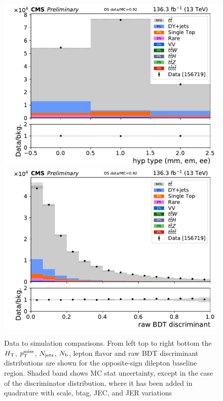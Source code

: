 \begin{figure}[!htb]
\includegraphics[width=0.45\linewidth]{figs/ftan/cr/run2_os_type_in.pdf} 
\includegraphics[width=0.45\linewidth]{figs/ftan/cr/run2_os_eventbdt_in.pdf} 
\caption{ Data to simulation comparisons. From left top to right bottom
  the $H_{\mathrm{T}}$, $p_{\mathrm{T}}^\text{miss}$, $N_\text{jets}$, $N_\mathrm{b}$, lepton flavor and raw BDT discriminant distributions are
shown for the opposite-sign dilepton baseline region. Shaded band shows MC stat uncertainty,
except in the case of the discriminator distribution, where it has been added in quadrature with
    scale, btag, JEC, and JER variations}
\label{fig:OSBaselineRun2}
\end{figure}


